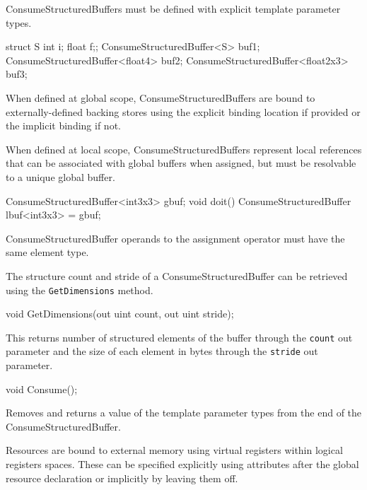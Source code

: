 
ConsumeStructuredBuffers must be defined with explicit template parameter types.
\begin{HLSL}
  struct S {int i; float f;};
  ConsumeStructuredBuffer<S> buf1;
  ConsumeStructuredBuffer<float4> buf2;
  ConsumeStructuredBuffer<float2x3> buf3;
\end{HLSL}

When defined at global scope, ConsumeStructuredBuffers are bound to externally-defined backing stores
using the explicit binding location if provided or the implicit binding if not.

When defined at local scope, ConsumeStructuredBuffers represent local references
that can be associated with global buffers when assigned,
but must be resolvable to a unique global buffer.

\begin{HLSL}
  ConsumeStructuredBuffer<int3x3> gbuf;
  void doit() {
    ConsumeStructuredBuffer lbuf<int3x3> = gbuf;
  }
\end{HLSL}
ConsumeStructuredBuffer operands to the assignment operator must have the same element type.


The structure count and stride of a ConsumeStructuredBuffer can be retrieved using the \texttt{GetDimensions} method.
\begin{HLSL}
void GetDimensions(out uint count, out uint stride);
\end{HLSL}

This returns number of structured elements of the buffer through the \texttt{count} out parameter
and the size of each element in bytes through the \texttt{stride} out parameter.


\begin{HLSL}
   void Consume();
\end{HLSL}

Removes and returns a value of the template parameter types from the end of the ConsumeStructuredBuffer.





Resources are bound to external memory using virtual registers within logical registers spaces.
These can be specified explicitly using attributes after the global resource declaration
or implicitly by leaving them off.

